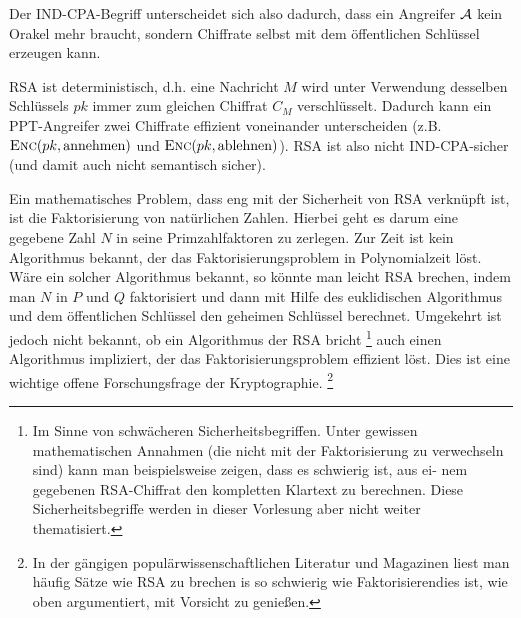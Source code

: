 Der IND-CPA-Begriff unterscheidet sich also dadurch, dass ein Angreifer
$\mathcal{A}$ kein Orakel mehr braucht, sondern Chiffrate selbst mit dem
öffentlichen Schlüssel erzeugen kann.

RSA ist deterministisch, d.h. eine Nachricht $M$ wird unter Verwendung
desselben Schlüssels $pk$ immer zum gleichen Chiffrat $C_M$
verschlüsselt. Dadurch kann ein PPT-Angreifer zwei Chiffrate effizient voneinander
unterscheiden (z.B. $\textsc{Enc}(pk, \text{annehmen})$ und $\textsc{Enc}(pk,
\text{ablehnen})$). RSA ist also nicht IND-CPA-sicher (und damit auch
nicht semantisch sicher). 


Ein mathematisches Problem, dass eng mit der Sicherheit von RSA
verknüpft ist, ist die Faktorisierung von natürlichen Zahlen. Hierbei
geht es darum eine gegebene Zahl $N$ in seine Primzahlfaktoren zu
zerlegen. Zur Zeit ist kein Algorithmus bekannt, der das
Faktorisierungsproblem in Polynomialzeit löst. Wäre ein solcher
Algorithmus bekannt, so könnte man leicht RSA \glqq brechen\grqq , indem
man $N$ in $P$ und $Q$ faktorisiert und dann mit Hilfe des euklidischen
Algorithmus und dem öffentlichen Schlüssel den geheimen Schlüssel
berechnet. Umgekehrt ist jedoch nicht bekannt, ob ein Algorithmus der
RSA bricht \footnote{Im Sinne von schwächeren
Sicherheitsbegriffen. Unter gewissen mathematischen Annahmen (die nicht
mit der Faktorisierung zu verwechseln sind) kann man beispielsweise
zeigen, dass es schwierig ist, aus ei- nem gegebenen RSA-Chiffrat den
kompletten Klartext zu berechnen. Diese Sicherheitsbegriffe werden in
dieser Vorlesung aber nicht weiter thematisiert.} auch einen Algorithmus
impliziert, der das Faktorisierungsproblem effizient löst. Dies ist eine
wichtige offene Forschungsfrage der Kryptographie. \footnote{In der
gängigen populärwissenschaftlichen Literatur und Magazinen liest man
häufig Sätze wie \glqq RSA zu brechen is so schwierig wie
Faktorisieren\grqq dies ist, wie oben argumentiert, mit Vorsicht zu
genießen.}

